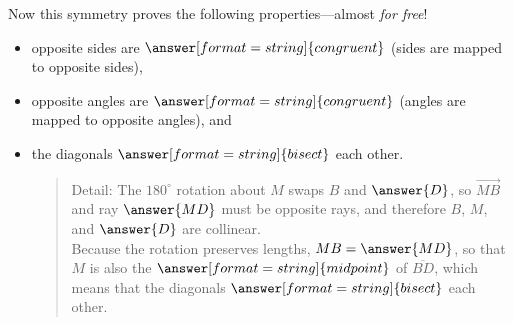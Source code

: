 \documentclass[nooutcomes]{ximera}
\begin{document}
\begin{problem}
\begin{problem}
Now this symmetry proves the following properties---almost \emph{for free}!  
\begin{itemize}
\item opposite sides are $\answer[format=string]{congruent}$ (sides are mapped to opposite sides), 
\item opposite angles are $\answer[format=string]{congruent}$ (angles are mapped to opposite angles), and 
\item the diagonals $\answer[format=string]{bisect}$ each other.
\begin{quote}
Detail: The $180^\circ$ rotation about $M$ swaps $B$ and $\answer{D}$, so $\overrightarrow{MB}$ 
and ray $\answer{MD}$ must be opposite rays, and therefore $B$, $M$, and $\answer{D}$ are collinear. \\ Because the rotation preserves lengths, $MB=\answer{MD}$, so that $M$ is also the $\answer[format=string]{midpoint}$ of $\overline{BD}$, which means that the diagonals $\answer[format=string]{bisect}$ each other.
\end{quote}
\end{itemize}
\end{problem}
\end{problem}
\end{document}

